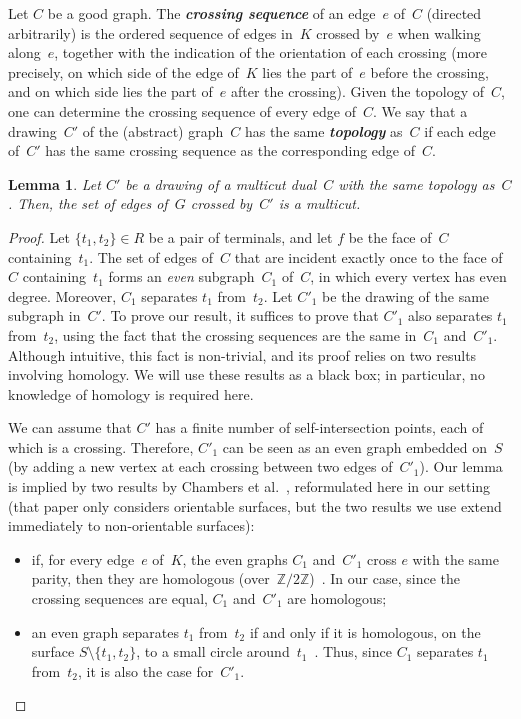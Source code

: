 \documentclass[11pt]{article}
\newcommand{\emphdef}[1]{\textcolor{blueblack}{\textbf{\emph{#1}}}}
\newcommand{\ZZ}{\ensuremath{\mathbb{Z}}}
\newcommand{\set}[1]{\ensuremath{\{#1\}}}
\theoremstyle{plain}  \newtheorem{theorem}{Theorem}[section]
\newtheorem{lemma}[theorem]{Lemma}
\theoremstyle{definition}
\begin{document}
Let $C$ be a good graph.  The \emphdef{crossing sequence} of an edge~$e$
of~$C$ (directed arbitrarily) is the ordered sequence of edges in~$K$
crossed by~$e$ when walking along~$e$, together with the indication of the
orientation of each crossing (more precisely, on which side of the edge
of~$K$ lies the part of~$e$ before the crossing, and on which side lies the
part of~$e$ after the crossing).  Given the topology of~$C$, one can
determine the crossing sequence of every edge of~$C$.  We say that a
drawing~$C'$ of the (abstract) graph~$C$ has the same \emphdef{topology}
as~$C$ if each edge of~$C'$ has the same crossing sequence as the
corresponding edge of~$C$.
\begin{lemma}\label{L:dualref}
  Let $C'$ be a drawing of a multicut dual~$C$ with the same topology
  as~$C$.  Then, the set of edges of~$G$ crossed by~$C'$ is a multicut.
\end{lemma}
\begin{proof}
  Let $\set{t_1,t_2}\in R$ be a pair of terminals, and let $f$ be the face
  of~$C$ containing~$t_1$.  The set of edges of~$C$ that are incident
  exactly once to the face of~$C$ containing~$t_1$ forms an \emph{even}
  subgraph~$C_1$ of~$C$, in which every vertex has even degree.  Moreover,
  $C_1$ separates $t_1$ from~$t_2$.  Let $C'_1$ be the drawing of the same
  subgraph in~$C'$.  To prove our result, it suffices to prove that $C'_1$
  also separates $t_1$ from~$t_2$, using the fact that the crossing
  sequences are the same in~$C_1$ and~$C'_1$.  Although intuitive, this
  fact is non-trivial, and its proof relies on two results involving
  homology.  We will use these results as a black box; in particular, no
  knowledge of homology is required here.

  We can assume that $C'$ has a finite number of self-intersection points,
  each of which is a crossing.  Therefore, $C'_1$ can be seen as an even
  graph embedded on~$S$ (by adding a new vertex at each crossing between
  two edges of~$C'_1$).  Our lemma is implied by two results by Chambers et
  al.~\cite{cen-mcshc-09}, reformulated here in our setting (that paper
  only considers orientable surfaces, but the two results we use extend
  immediately to non-orientable surfaces):
  \begin{itemize}
  \item if, for every edge~$e$ of~$K$, the even graphs $C_1$ and~$C'_1$
    cross $e$ with the same parity, then they are homologous
    (over~$\ZZ/2\ZZ$)~\cite[Lemma~3.4]{cen-mcshc-09}.  In our case, since the
    crossing sequences are equal, $C_1$ and~$C'_1$ are homologous;
  \item an even graph separates $t_1$ from~$t_2$ if and only if it is
    homologous, on the surface $S\setminus\{t_1,t_2\}$, to a small circle
    around~$t_1$~\cite[Lemma~3.1]{cen-mcshc-09}.  Thus, since $C_1$
    separates $t_1$ from~$t_2$, it is also the case for~$C'_1$.\qedhere
  \end{itemize}
\end{proof}
\end{document}
